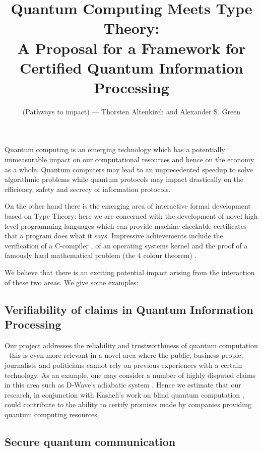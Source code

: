 \documentclass[a4paper]{article}
\title{Quantum Computing Meets Type Theory:\\
 \Large A Proposal for a Framework for Certified Quantum Information Processing
}
\author{(Pathways to impact) --- Thorsten Altenkirch and Alexander S. Green}
\date{}
\begin{document}

\maketitle

Quantum computing is an emerging technology which has a potentially
immeasurable impact on our computational resources and hence on the
economy as a whole. Quantum computers may lead to an unprecedented
speedup to solve algorithmic problems while quantum protocols may
impact drastically on the efficiency, safety and secrecy of
information protocols.

On the other hand there is the emerging area of interactive formal
development based on Type Theory: here we are concerned with the development
of novel high level programming languages which can provide machine
checkable certificates that a program does what it says. Impressive
achievements include the verification of a C-compiler \cite{compcert-back}, 
of an operating
systems kernel \cite{seL4_CACM_10} and the proof of a famously hard mathematical problem
(the 4 colour theorem) \cite{gonthier:four-colour-paper}.

We believe that there is an exciting potential impact arising from the
interaction of these two areas. We give some examples:

\subsection*{Verifiability of claims in Quantum Information Processing}
\label{sec:do-you-realy}

Our project addresses the reliability and
trustworthiness of quantum computation - this is even more relevant in
a novel area where the public, business people, journalists and
politicians cannot rely on previous experiences with a certain
technology. As an example, one may consider a number of highly
disputed claims in this area such as D-Wave's adiabatic system
\cite{dwave}. Hence we estimate that our research, in conjunction with
Kashefi's work on blind quantum computation \cite{blind}, 
could contribute to the ability to certify promises made by companies
providing quantum computing resources.

\subsection*{Secure quantum communication}
\label{sec:secure-quant-comm}
\end{document}
